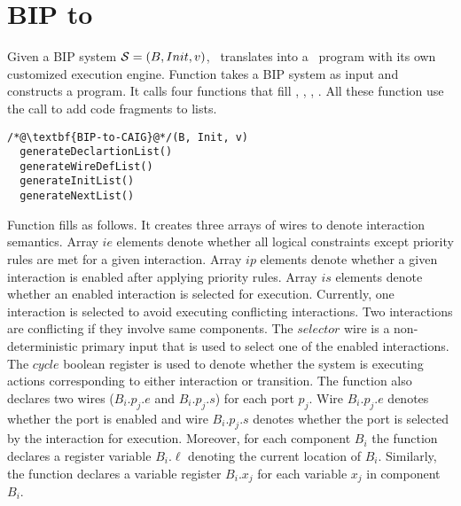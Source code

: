 
\section{BIP to \caig}
\label{chap3:bip2aig:bip2etc}
Given a BIP system $\mathcal{S} = (B, Init, v)$, \biptool~translates \Pm into 
a \caig~program with its own customized execution engine. Function  takes a BIP system as input and constructs a \caig program. It calls four functions that fill , , , . All these function use the  call to add code fragments to lists. 

\begin{lstlisting}
/*@\textbf{BIP-to-CAIG}@*/(B, Init, v)
  generateDeclartionList()
  generateWireDefList()
  generateInitList()
  generateNextList()
\end{lstlisting}

Function  fills  as follows. 
It creates three arrays of wires to denote interaction semantics. Array $ie$ elements denote whether all logical constraints except priority rules are met for a given interaction. Array $ip$ elements denote whether a given interaction is enabled after applying priority rules. Array $is$ elements denote whether an enabled interaction is selected for execution. Currently, one interaction is selected to avoid executing conflicting interactions. Two interactions are conflicting if they involve same components. The $selector$ wire is a non-deterministic primary input that is used to select one of the enabled interactions. The $cycle$ boolean register is used to denote whether the system is executing actions corresponding to either interaction or transition. 
The function also declares two wires ($B_i.p_j.e$ and $B_i.p_j.s$) for each port $p_j$. Wire $B_i.p_j.e$ denotes whether the port is enabled and wire $B_i.p_j.s$ denotes whether the port is selected by the interaction for execution. Moreover, for each component $B_i$ the function declares a register variable $B_i.\ell$ denoting the current location of $B_i$. Similarly, the function declares a variable register $B_i.x_j$ for each variable $x_j$ in component $B_i$.  


